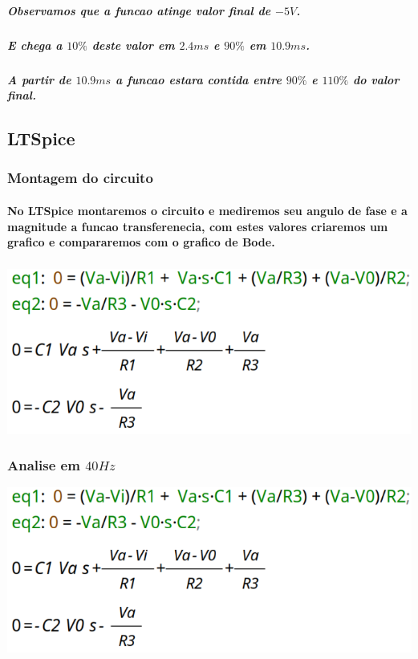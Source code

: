 \documentclass[12pt,twoside, a4paper, twocolumn]{article}
\begin{document}
\subparagraph*{Observamos que a funcao atinge valor final de $-5V$.}

\subparagraph*{E chega a $10\%$ deste valor em $2.4ms$ e $90\%$ em $10.9ms$.}

\subparagraph*{A partir de $10.9ms$ a funcao estara contida entre $90\%$ e $110\%$ do valor final.}



\newpage




\subsection{LTSpice}

\subsubsection*{Montagem do circuito}

\paragraph*{No LTSpice montaremos o circuito e mediremos seu angulo de fase e a magnitude a funcao transferenecia, com estes valores criaremos um grafico e compararemos com o grafico de Bode.}
\subparagraph*{}
\begin{adjustbox}{scale=0.09}
    \includegraphics{eqs.png}
\end{adjustbox}


\subsubsection{Analise em $40Hz$}


\begin{adjustbox}{scale=0.09}
    \includegraphics{eqs.png}
\end{adjustbox}
\end{document}
